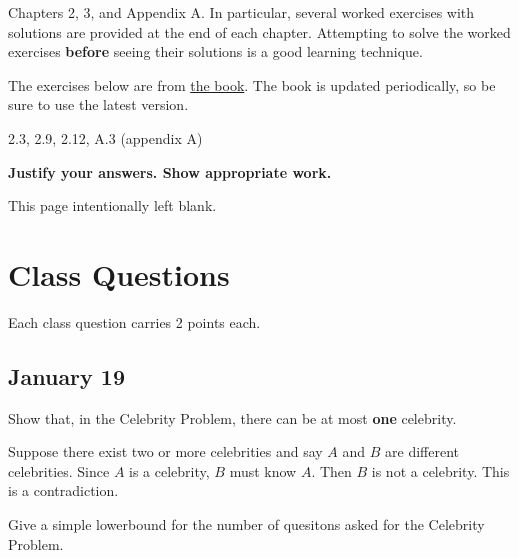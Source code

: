 \documentclass[final]{article}
\begin{document}
\begin{titlepage}
    \begin{tcolorbox}[title=Reading,fonttitle=\bfseries]
        Chapters 2, 3, and Appendix A. In particular, several worked exercises with solutions are provided at the end of each chapter. Attempting to solve the worked exercises \textbf{before} seeing their solutions is a good learning technique.
    \end{tcolorbox}
    The exercises below are from \href{https://sites.google.com/site/gopalpandurangan/home/algorithms-course}{the book}. The book is updated periodically, so be sure to use the latest version.

    \begin{tcolorbox}[title=Exercises,fonttitle=\bfseries]
        2.3, 2.9, 2.12, A.3 (appendix A)
    \end{tcolorbox}

    \textbf{Justify your answers. Show appropriate work.}
\end{titlepage}
\vspace*{\fill}\begin{center}{\Huge This page intentionally left blank.}\end{center}\vspace*{\fill}\thispagestyle{empty}\clearpage
{}

\section{Class Questions}
Each class question carries 2 points each.
\subsection{January 19}

\begin{question}
    Show that, in the Celebrity Problem, there can be at most \textbf{one} celebrity.
\end{question}

\begin{solution}
    Suppose there exist two or more celebrities and say $A$ and $B$ are different celebrities. Since $A$ is a celebrity, $B$ must know $A$. Then $B$ is not a celebrity. This is a contradiction.
\end{solution}

\begin{question}
    Give a simple lowerbound for the number of quesitons asked for the Celebrity Problem.
\end{question}
\end{document}
